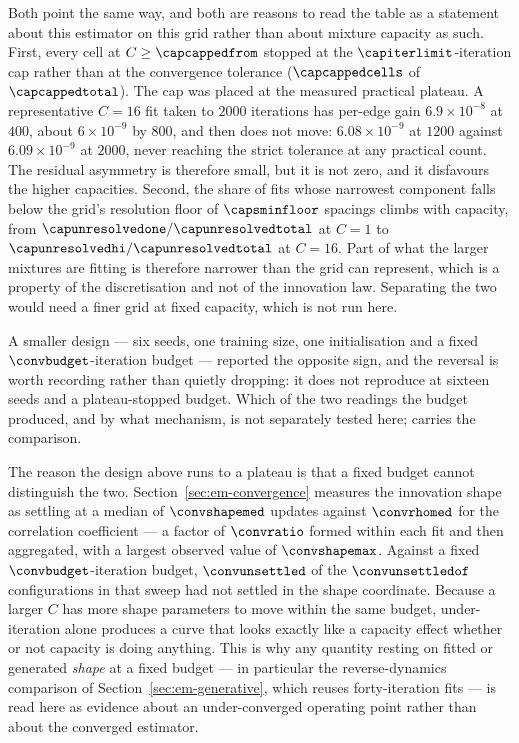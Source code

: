 \begin{remark}\label{rmk:em-capacity-caveats}
Both point the same way, and both are reasons to read the table as a statement
about this estimator on this grid rather than about mixture capacity as such.
First, every cell at $C \geq \capcappedfrom$ stopped at the
$\capiterlimit$-iteration cap rather than at the convergence tolerance
($\capcappedcells$ of $\capcappedtotal$). The cap was placed at the measured
practical plateau. A representative $C=16$ fit taken to $2000$ iterations has
per-edge gain $6.9\times10^{-8}$ at $400$, about $6\times10^{-9}$ by $800$, and
then does not move: $6.08\times10^{-9}$ at $1200$ against
$6.09\times10^{-9}$ at $2000$, never reaching the strict tolerance at any
practical count. The residual asymmetry is therefore small, but it is not zero,
and it disfavours the higher capacities. Second, the share of fits whose narrowest component falls
below the grid's resolution floor of $\capsminfloor$ spacings climbs with
capacity, from $\capunresolvedone/\capunresolvedtotal$ at $C=1$ to
$\capunresolvedhi/\capunresolvedtotal$ at $C=16$. Part of what the larger
mixtures are fitting is therefore narrower than the grid can represent, which is
a property of the discretisation and not of the innovation law. Separating the
two would need a finer grid at fixed capacity, which is not run here.
\end{remark}

\noindent A smaller design --- six seeds, one training size, one initialisation
and a fixed $\convbudget$-iteration budget --- reported the opposite sign, and
the reversal is worth recording rather than quietly dropping: it does not
reproduce at sixteen seeds and a plateau-stopped budget. Which of the two
readings the budget produced, and by what mechanism, is not separately tested
here; \compendium{} carries the comparison.

\begin{remark}\label{rmk:em-capacity-confound}
The reason the design above runs to a plateau is that a fixed budget cannot
distinguish the two. Section~\ref{sec:em-convergence} measures the innovation
shape as settling at a median of $\convshapemed$ updates against
$\convrhomed$ for the correlation coefficient --- a factor of $\convratio$
formed within each fit and then aggregated, with a largest observed value of
$\convshapemax$. Against a fixed $\convbudget$-iteration budget,
$\convunsettled$ of the $\convunsettledof$ configurations in that sweep had not
settled in the shape coordinate. Because a larger $C$ has more shape
parameters to move within the same budget, under-iteration alone produces a
curve that looks exactly like a capacity effect whether or not capacity is doing
anything. This is why
any quantity resting on fitted or generated \emph{shape} at a fixed budget --- in
particular the reverse-dynamics comparison of
Section~\ref{sec:em-generative}, which reuses forty-iteration fits --- is read
here as evidence about an under-converged operating point rather than about the
converged estimator.
\end{remark}

